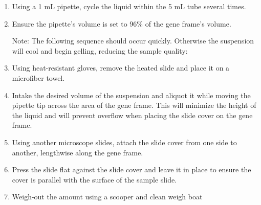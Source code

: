 \begin{enumerate}
    \item Using a 1 mL pipette, cycle the liquid within the 5 mL tube several times.

    \item Ensure the pipette's volume is set to 96\% of the gene frame's volume.

    Note: The following sequence should occur quickly. Otherwise the suspension will cool and begin gelling, reducing the sample quality:

    \item Using heat-resistant gloves, remove the heated slide and place it on a microfiber towel.

    \item Intake the desired volume of the suspension and aliquot it while moving the pipette tip across the area of the gene frame. This will minimize the height of the liquid and will prevent overflow when placing the slide cover on the gene frame.

    \item Using another microscope slides, attach the slide cover from one side to another, lengthwise along the gene frame.

    \item Press the slide flat against the slide cover and leave it in place to ensure the cover is parallel with the surface of the sample slide.
    
    \item Weigh-out the amount using a scooper and clean weigh boat
    

\end{enumerate}
